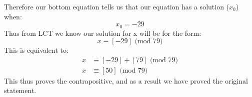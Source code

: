 \documentclass[11pt]{article}
\begin{document}
Therefore our bottom equation tells us that our equation has a solution ($x_0$) when:
\[  x_0 = -29 \]
Thus from LCT we know our solution for x will be for the form:
\[ x \equiv [-29] \text{ (mod 79)} \]
This is equivalent to:
\begin{align*}
 x & \equiv [-29] + [79] \text{ (mod 79)} \\
 x & \equiv [50]  \text{ (mod 79)} 
\end{align*}
This thus proves the contrapositive, and as a result we have proved the original statement.
\end{document}
